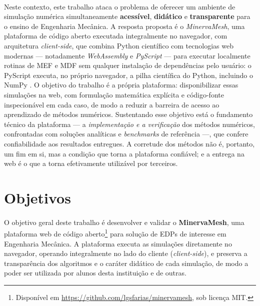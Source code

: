 \paragraph{}Neste contexto, este trabalho ataca o problema de oferecer um ambiente de simulação numérica simultaneamente \textbf{acessível}, \textbf{didático} e \textbf{transparente} para o ensino de Engenharia Mecânica. A resposta proposta é o \textit{MinervaMesh}, uma plataforma de código aberto executada integralmente no navegador, com arquitetura \textit{client-side}, que combina Python científico com tecnologias web modernas --- notadamente \textit{WebAssembly} e \textit{PyScript} --- para executar localmente rotinas de MEF e MDF sem qualquer instalação de dependências pelo usuário: o PyScript \cite{PyScript2023} executa, no próprio navegador, a pilha científica do Python, incluindo o NumPy \cite{Harris2020}. O objetivo do trabalho é a própria plataforma: disponibilizar essas simulações na web, com formulação matemática explícita e código-fonte inspecionável em cada caso, de modo a reduzir a barreira de acesso ao aprendizado de métodos numéricos. Sustentando esse objetivo está o fundamento técnico da plataforma --- a \textit{implementação e a verificação} dos métodos numéricos, confrontadas com soluções analíticas e \textit{benchmarks} de referência ---, que confere confiabilidade aos resultados entregues. A corretude dos métodos não é, portanto, um fim em si, mas a condição que torna a plataforma confiável; e a entrega na web é o que a torna efetivamente utilizável por terceiros.

\section{Objetivos}

\paragraph{}O objetivo geral deste trabalho é desenvolver e validar o \textbf{MinervaMesh}, uma plataforma web de código aberto\footnote{Disponível em \url{https://github.com/lgsfarias/minervamesh}, sob licença MIT.} para solução de EDPs de interesse em Engenharia Mecânica. A plataforma executa as simulações diretamente no navegador, operando integralmente no lado do cliente (\textit{client-side}), e preserva a transparência dos algoritmos e o caráter didático de cada simulação, de modo a poder ser utilizada por alunos desta instituição e de outras.

